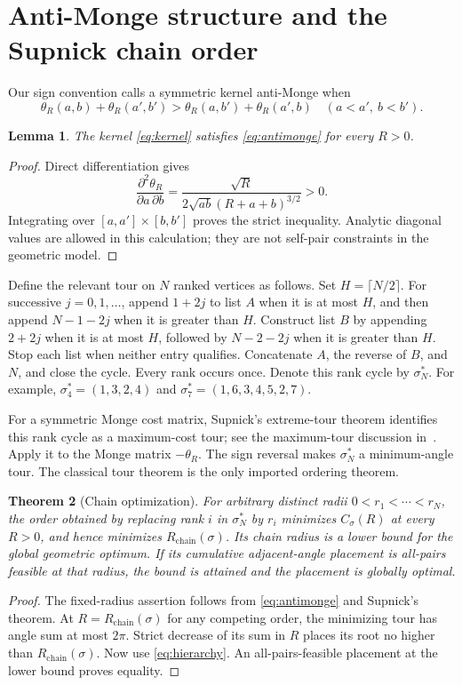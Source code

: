 \documentclass[11pt]{article}
\newtheorem{theorem}{Theorem}[section]
\newtheorem{lemma}[theorem]{Lemma}
\theoremstyle{definition}
\theoremstyle{remark}
\newcommand{\Rchain}{R_{\mathrm{chain}}}
\begin{document}
\section{Anti-Monge structure and the Supnick chain order}\label{sec:chain}
Our sign convention calls a symmetric kernel anti-Monge when
\begin{equation}\label{eq:antimonge}
 \theta_R(a,b)+\theta_R(a',b')>
 \theta_R(a,b')+\theta_R(a',b)
 \quad(a<a',\ b<b').
\end{equation}
\begin{lemma}
The kernel \eqref{eq:kernel} satisfies \eqref{eq:antimonge} for every $R>0$.
\end{lemma}
\begin{proof}
Direct differentiation gives
\begin{equation}\label{eq:mixed}
 \frac{\partial^2\theta_R}{\partial a\,\partial b}
 =\frac{\sqrt R}{2\sqrt{ab}(R+a+b)^{3/2}}>0.
\end{equation}
Integrating over $[a,a']\times[b,b']$ proves the strict inequality.
Analytic diagonal values are allowed in this calculation; they are not
self-pair constraints in the geometric model.
\end{proof}

Define the relevant tour on $N$ ranked vertices as follows.
Set $H=\lceil N/2\rceil$. For successive $j=0,1,\ldots$,
append $1+2j$ to list $A$ when it is at most $H$, and then append
$N-1-2j$ when it is greater than $H$. Construct list $B$ by appending
$2+2j$ when it is at most $H$, followed by $N-2-2j$ when it is greater
than $H$. Stop each list when neither entry qualifies. Concatenate
$A$, the reverse of $B$, and $N$, and close the cycle. Every rank occurs
once. Denote this rank cycle by $\sigma^*_N$. For example,
$\sigma^*_4=(1,3,2,4)$ and $\sigma^*_7=(1,6,3,4,5,2,7)$.

For a symmetric Monge cost matrix, Supnick's extreme-tour theorem
identifies this rank cycle as a maximum-cost tour; see the maximum-tour
discussion in~\cite{survey}. Apply it to the Monge matrix $-\theta_R$.
The sign reversal makes $\sigma^*_N$ a minimum-angle tour. The classical
tour theorem is the only imported ordering theorem.

\begin{theorem}[Chain optimization]\label{thm:chain}
For arbitrary distinct radii $0<r_1<\cdots<r_N$, the order obtained by
replacing rank $i$ in $\sigma^*_N$ by $r_i$ minimizes $C_\sigma(R)$
at every $R>0$, and hence minimizes $\Rchain(\sigma)$. Its chain
radius is a lower bound for the global geometric optimum. If its cumulative
adjacent-angle placement is all-pairs feasible at that radius, the bound
is attained and the placement is globally optimal.
\end{theorem}
\begin{proof}
The fixed-radius assertion follows from \eqref{eq:antimonge} and Supnick's
theorem. At $R=\Rchain(\sigma)$ for any competing order, the minimizing
tour has angle sum at most $2\pi$. Strict decrease of its sum in $R$
places its root no higher than $\Rchain(\sigma)$. Now use
\eqref{eq:hierarchy}. An all-pairs-feasible placement at the lower bound
proves equality.
\end{proof}
\end{document}
